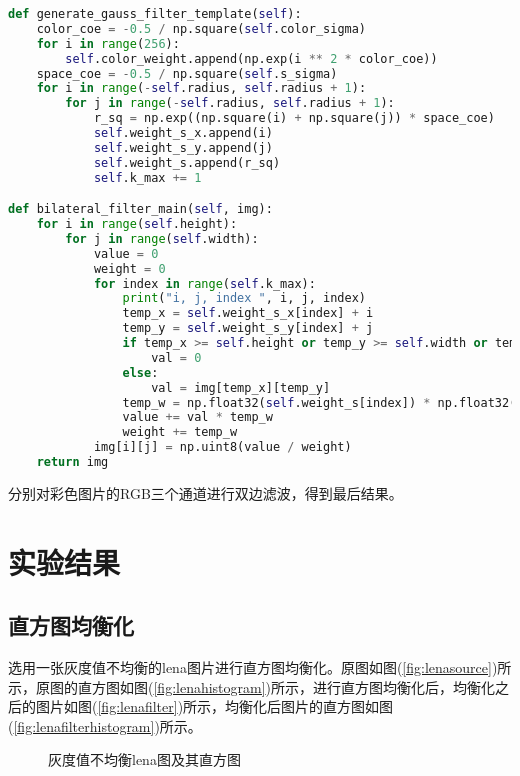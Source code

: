 \documentclass{hitreport}
\begin{document}
\begin{lstlisting}[language=python]
def generate_gauss_filter_template(self):
    color_coe = -0.5 / np.square(self.color_sigma)
    for i in range(256):
        self.color_weight.append(np.exp(i ** 2 * color_coe))
    space_coe = -0.5 / np.square(self.s_sigma)
    for i in range(-self.radius, self.radius + 1):
        for j in range(-self.radius, self.radius + 1):
            r_sq = np.exp((np.square(i) + np.square(j)) * space_coe)
            self.weight_s_x.append(i)
            self.weight_s_y.append(j)
            self.weight_s.append(r_sq)
            self.k_max += 1

def bilateral_filter_main(self, img):
    for i in range(self.height):
        for j in range(self.width):
            value = 0
            weight = 0
            for index in range(self.k_max):
                print("i, j, index ", i, j, index)
                temp_x = self.weight_s_x[index] + i
                temp_y = self.weight_s_y[index] + j
                if temp_x >= self.height or temp_y >= self.width or temp_x < 0 or temp_y < 0:
                    val = 0
                else:
                    val = img[temp_x][temp_y]
                temp_w = np.float32(self.weight_s[index]) * np.float32(self.color_weight[np.abs(val - img[i][j])])
                value += val * temp_w
                weight += temp_w
            img[i][j] = np.uint8(value / weight)
    return img

\end{lstlisting}

分别对彩色图片的RGB三个通道进行双边滤波，得到最后结果。

\section{实验结果}

\subsection{直方图均衡化}

选用一张灰度值不均衡的lena图片进行直方图均衡化。原图如图(\ref{fig:lenasource})所示，原图的直方图如图(\ref{fig:lenahistogram})所示，进行直方图均衡化后，均衡化之后的图片如图(\ref{fig:lenafilter})所示，均衡化后图片的直方图如图(\ref{fig:lenafilterhistogram})所示。

\begin{figure}[htb]
	\centering
	\hspace{20pt}
	\caption{灰度值不均衡lena图及其直方图}\label{fig:lena}
\end{figure}
\end{document}
